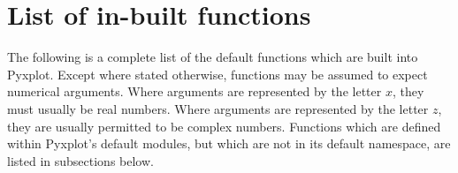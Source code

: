 %
%
%
%
%



\chapter{List of in-built functions}
\label{ch:function_list}

The following is a complete list of the default functions which are built into
Pyxplot. Except where stated otherwise, functions may be assumed to expect
numerical arguments. Where arguments are represented by the letter $x$, they
must usually be real numbers. Where arguments are represented by the letter
$z$, they are usually permitted to be complex numbers.  Functions which are
defined within Pyxplot's default modules, but which are not in its default
namespace, are listed in subsections below.

